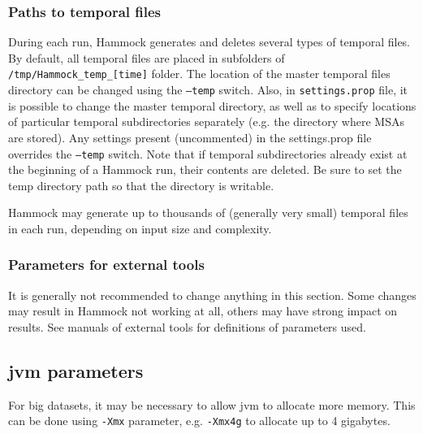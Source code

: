 \documentclass[11pt, a4paper, twoside, titlepage]{article}
\begin{document}
\subsubsection{Paths to temporal files}
During each run, Hammock generates and deletes several types of temporal files. By default, all temporal files are placed in subfolders of \texttt{/tmp/Hammock\_temp\_[time]} folder. The location of the master temporal files directory can be changed using the \texttt{--temp} switch. Also, in \texttt{settings.prop} file, it is possible to change the master temporal directory, as well as to specify locations of particular temporal subdirectories separately (e.g. the directory where MSAs are stored). Any settings present (uncommented) in the settings.prop file overrides the \texttt{--temp} switch. Note that if temporal subdirectories already exist at the beginning of a Hammock run, their contents are deleted. Be sure to set the temp directory path so that the directory is writable.

 Hammock may generate up to thousands of (generally very small) temporal files in each run, depending on input size and complexity.

\subsubsection{Parameters for external tools}
It is generally not recommended to change anything in this section. Some changes may result in Hammock not working at all, others may have strong impact on results. See manuals of external tools for definitions of parameters used.

\subsection{jvm parameters}
For big datasets, it may be necessary to allow jvm to allocate more memory. This can be done using \texttt{-Xmx} parameter, e.g. \texttt{-Xmx4g} to allocate up to 4 gigabytes. 





{}
\end{document}
